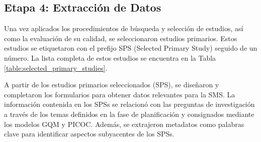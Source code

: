 \subsection{Etapa 4: Extracción de Datos}\label{sec:extraccion-de-datos}

Una vez aplicados los procedimientos de búsqueda y selección de estudios, así como la evaluación de su calidad, se seleccionaron \totalEtapaDos{} estudios primarios. Estos estudios se etiquetaron con el prefijo SPS (Selected Primary Study) seguido de un número. La lista completa de estos estudios se encuentra en la Tabla \ref{table:selected_primary_studies}.

A partir de los \totalEtapaDos{} estudios primarios seleccionados (SPS), se diseñaron y completaron los formularios para obtener datos relevantes para la SMS. La información contenida en los SPSs se relacionó con las preguntas de investigación a través de los temas definidos en la fase de planificación y consignados mediante los modelos GQM y PICOC. Además, se extrajeron metadatos como palabras clave para identificar aspectos subyacentes de los SPSs.


